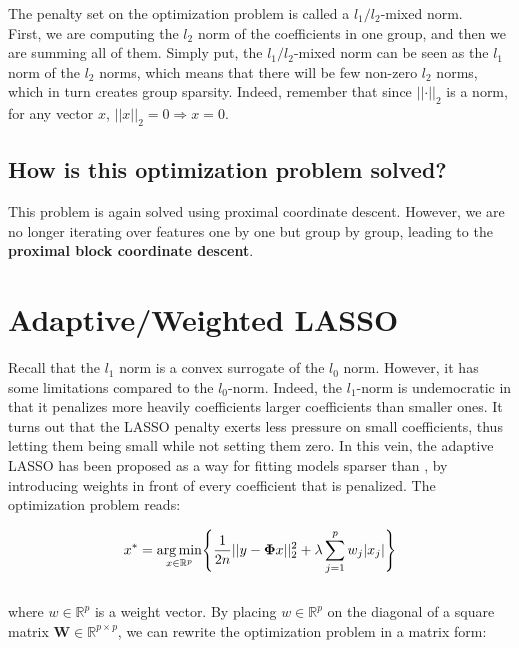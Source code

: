 \documentclass[a4paper,10pt]{article}
\theoremstyle{definition}
\begin{document}
The penalty set on the optimization problem is called a $l_1/l_2$-mixed norm.
\\

First, we are computing the $l_2$ norm of the coefficients in one group, and then we are summing all of them. Simply put, the $l_1/l_2$-mixed norm can be seen
as the $l_1$ norm of the $l_2$ norms, which means that there will be few non-zero $l_2$ norms, which in turn creates group sparsity. Indeed, remember that since $\lvert \lvert \cdot \rvert \rvert_2$ is a norm, for any vector $x$,
$\lvert\lvert x \rvert\rvert_2 = 0 \Rightarrow x = 0$.

\subsection*{How is this optimization problem solved?}

This problem is again solved using proximal coordinate descent. However, we are no longer iterating over features one by one but group by group, leading to the \textbf{proximal block coordinate descent}.

\section{Adaptive/Weighted LASSO}
\label{section_3}

Recall that the $l_1$ norm is a convex surrogate of the $l_0$ norm. However, it has some limitations compared to
the $l_0$-norm. Indeed, the $l_1$-norm is undemocratic in that it penalizes more heavily coefficients larger coefficients than smaller ones. It turns out that the LASSO penalty exerts less pressure on small coefficients,
thus letting them being small while not setting them zero. In this vein, the adaptive LASSO has been proposed as a way for fitting models sparser than , by introducing weights in front of every coefficient that is
penalized. The optimization problem reads:

\begin{equation*}
    x^* = \operatorname*{arg\,min}_{x \in \mathbb{R}^p} \Biggl\{ \frac{1}{2n} \lvert\lvert y - \mathbf{\Phi}x \rvert\rvert_2^2 + \lambda \sum_{j=1}^p w_j \lvert x_j \rvert \Biggr\}
\end{equation*}
\\
where $w \in \mathbb{R}^p$ is a weight vector. By placing $w \in \mathbb{R}^p$ on the diagonal of a square matrix $\mathbf{W} \in \mathbb{R}^{p \times p}$, we can rewrite the optimization problem in a matrix form:
\end{document}
